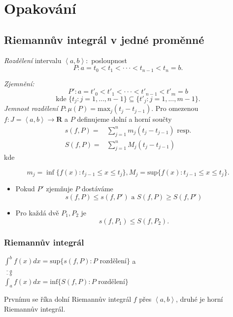 \documentclass[../main.tex]{subfiles}
\begin{document}
\section{Opakování}
\subsection{Riemannův integrál v jedné proměnné}
\hspace{1.2mm}
\textit{Rozdělení} intervalu $\left<a,b\right> : $ posloupnost 
\[P : a = t_0 < t_1 < \cdot \cdot \cdot < t_{n-1} < t_n = b.\]


{\normalsize
\textit{Zjemnění:
\[P' : a = t'_0 < t'_1 < \cdot \cdot \cdot < t'_{n-1} < t'_m = b\]
\[\text{kde }\{t_j: j = 1,...,n-1\}\subseteq \{t'_j : j = 1,...,m-1\}.\]
}}
\textit{Jemnost rozdělení} $P: \mu(P) = \text{max}_j(t_j-t_{j-1}).$
\noindent
Pro omezenou $f:J=\left<a,b\right> \rightarrow \mathbf{R} $ a $P$ definujeme dolní a horní součty
\begin{align*}
    s(f,P) = & \sum^n_{j=1} m_j(t_j-t_{j-1}) \text{ resp.}\\
    S(f,P) = & \sum^n_{j=1} M_j(t_j-t_{j-1})
\end{align*}
kde

\[m_j = \inf\{f(x) : t_{j-1} \leq x \leq t_j\}, M_j = \text{sup}\{f(x) : t_{j-1} \leq x \leq t_j\}.\]

\begin{itemize}
    \item Pokud $P'$ zjemňuje $P$ dostáváme
    \[s(f,P) \leq s(f,P') \text{ a } S(f,P) \geq S(f,P')\]
    \item Pro každá dvě $P_1, P_2$ je 
    \[s(f,P_1) \leq S(f, P_2).\]
\end{itemize}

\subsubsection{Riemannův integrál}
\hspace{1.2mm}
$\underline{\int}^b_{ a} f(x)dx = \text{sup}\{s(f,P) : P \text{ rozdělení}\}$ a
$\overline{\int}^b_{ a} f(x)dx = \text{inf}\{S(f,P) : P \text{ rozdělení}\}$ 

Prvnímu se říka dolní Riemannův integrál $f$ přes $\left<a,b\right>$, druhé je horní Riemannův integrál.
\end{document}
